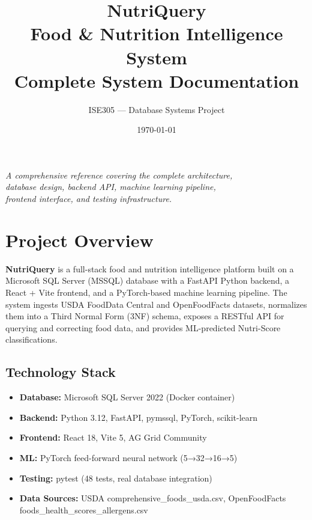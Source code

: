 \documentclass[12pt,a4paper]{article}
\title{\Huge\textbf{NutriQuery}\\[0.3cm]
       \Large Food \& Nutrition Intelligence System\\[0.3cm]
       \large Complete System Documentation}
\author{ISE305 — Database Systems Project}
\date{\today}
\begin{document}
\maketitle
\thispagestyle{empty}

\vspace{2cm}
\begin{center}
\textit{A comprehensive reference covering the complete architecture,\\
database design, backend API, machine learning pipeline,\\
frontend interface, and testing infrastructure.}
\end{center}

\newpage
\tableofcontents
\newpage

\section{Project Overview}

\textbf{NutriQuery} is a full-stack food and nutrition intelligence platform built on a Microsoft SQL Server (MSSQL) database with a FastAPI Python backend, a React + Vite frontend, and a PyTorch-based machine learning pipeline. The system ingests USDA FoodData Central and OpenFoodFacts datasets, normalizes them into a Third Normal Form (3NF) schema, exposes a RESTful API for querying and correcting food data, and provides ML-predicted Nutri-Score classifications.

\subsection{Technology Stack}
\begin{itemize}[nosep]
    \item \textbf{Database:} Microsoft SQL Server 2022 (Docker container)
    \item \textbf{Backend:} Python 3.12, FastAPI, pymssql, PyTorch, scikit-learn
    \item \textbf{Frontend:} React 18, Vite 5, AG Grid Community
    \item \textbf{ML:} PyTorch feed-forward neural network (5→32→16→5)
    \item \textbf{Testing:} pytest (48 tests, real database integration)
    \item \textbf{Data Sources:} USDA comprehensive\_foods\_usda.csv, OpenFoodFacts foods\_health\_scores\_allergens.csv
\end{itemize}
\end{document}
